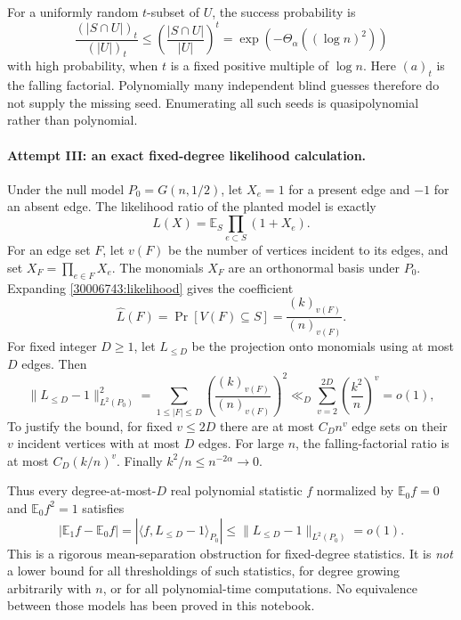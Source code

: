 \documentclass[11pt,a4paper]{article}
\newcommand{\E}{\mathbb{E}}
\numberwithin{equation}{section}
\begin{document}
For a uniformly random $t$-subset of $U$, the success probability is
\[
 \frac{(|S\cap U|)_t}{(|U|)_t}
 \leq\left(\frac{|S\cap U|}{|U|}\right)^t
 =\exp(-\Theta_\alpha((\log n)^2))
\]
with high probability, when $t$ is a fixed positive multiple of
$\log n$.  Here $(a)_t$ is the falling factorial.  Polynomially many
independent blind guesses therefore do not supply the missing seed.
Enumerating all such seeds is quasipolynomial rather than polynomial.

\paragraph{Attempt III: an exact fixed-degree likelihood calculation.}
Under the null model $P_0=G(n,1/2)$, let $X_e=1$ for a present edge
and $-1$ for an absent edge.  The likelihood ratio of the planted
model is exactly
\begin{equation}\label{30006743:likelihood}
 L(X)=\E_S\prod_{e\subset S}(1+X_e).
\end{equation}
For an edge set $F$, let $v(F)$ be the number of vertices incident to
its edges, and set $X_F=\prod_{e\in F}X_e$.  The monomials $X_F$ are
an orthonormal basis under $P_0$.  Expanding \eqref{30006743:likelihood}
gives the coefficient
\[
 \widehat L(F)=\Pr[V(F)\subseteq S]=\frac{(k)_{v(F)}}{(n)_{v(F)}}.
\]
For fixed integer $D\geq1$, let $L_{\leq D}$ be the projection onto
monomials using at most $D$ edges.  Then
\begin{equation}\label{30006743:lowdegree}
 \|L_{\leq D}-1\|_{L^2(P_0)}^2
 =\sum_{1\leq|F|\leq D}
       \left(\frac{(k)_{v(F)}}{(n)_{v(F)}}\right)^2
 \ll_D\sum_{v=2}^{2D}\left(\frac{k^2}{n}\right)^v=o(1),
\end{equation}
To justify the bound, for fixed $v\leq2D$ there are at most
$C_D n^v$ edge sets on their $v$ incident vertices with at most $D$
edges.  For large $n$, the falling-factorial ratio is at most
$C_D(k/n)^v$.  Finally $k^2/n\leq n^{-2\alpha}\to0$.

Thus every degree-at-most-$D$ real polynomial statistic $f$ normalized
by $\E_0f=0$ and $\E_0f^2=1$ satisfies
\[
 |\E_1f-\E_0f|
   =|\langle f,L_{\leq D}-1\rangle_{P_0}|
   \leq\|L_{\leq D}-1\|_{L^2(P_0)}=o(1).
\]
This is a rigorous mean-separation obstruction for fixed-degree
statistics.  It is \emph{not} a lower bound for all thresholdings of
such statistics, for degree growing arbitrarily with $n$, or for
all polynomial-time computations.  No equivalence between those
models has been proved in this notebook.
\end{document}

